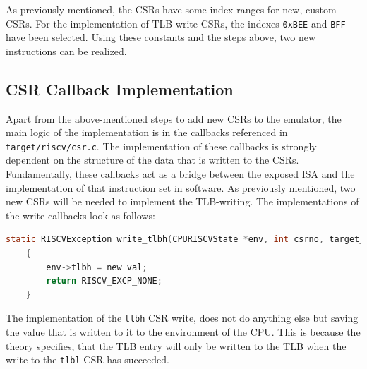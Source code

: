 As previously mentioned, the CSRs have some index ranges for new, custom CSRs. For the implementation
of TLB write CSRs, the indexes \texttt{0xBEE} and \texttt{BFF} have been selected.
Using these constants and the steps above, two new instructions can be realized.

\subsection{CSR Callback Implementation} Apart from the above-mentioned steps to add new CSRs to the emulator, the
main logic of the implementation is in the callbacks referenced in \texttt{target/riscv/csr.c}.
The implementation of these callbacks is strongly dependent on the structure of the data that is written to
the CSRs. Fundamentally, these callbacks act as a bridge between the exposed ISA and the implementation of
that instruction set in software.
As previously mentioned, two new CSRs will be needed to implement the TLB-writing. 
The implementations
of the write-callbacks look as follows:



\begin{lstlisting}[language=c,float=h!,
    label={lst:tlbh}]
    static RISCVException write_tlbh(CPURISCVState *env, int csrno, target_ulong new_val)
    {
        env->tlbh = new_val;
        return RISCV_EXCP_NONE;
    }
\end{lstlisting}
The implementation of the \texttt{tlbh} CSR write, does not do anything else but saving the value
that is written to it to the environment of the CPU.
This is because the theory specifies, that the TLB entry will only
be written to the TLB when the write to the \texttt{tlbl} CSR has succeeded.

